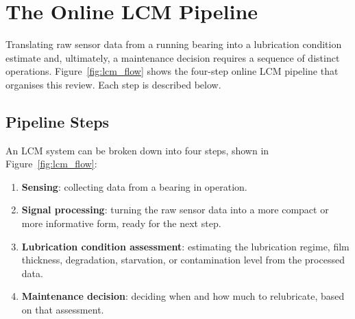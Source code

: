 \section{The Online LCM Pipeline}
\label{sec:lcm_pipeline}
Translating raw sensor data from a running bearing into a lubrication condition estimate and, ultimately, a maintenance decision requires a sequence of distinct operations. Figure~\ref{fig:lcm_flow} shows the four-step online LCM pipeline that organises this review. Each step is described below.

\subsection{Pipeline Steps}
\label{subsec:flow}

An LCM system can be broken down into four steps, shown in Figure~\ref{fig:lcm_flow}:
\begin{enumerate}
    \item \textbf{Sensing}: collecting data from a bearing in operation.
    \item \textbf{Signal processing}: turning the raw sensor data into a more compact or more informative form, ready for the next step.
    \item \textbf{Lubrication condition assessment}: estimating the lubrication regime, film thickness, degradation, starvation, or contamination level from the processed data.
    \item \textbf{Maintenance decision}: deciding when and how much to relubricate, based on that assessment.
\end{enumerate}

